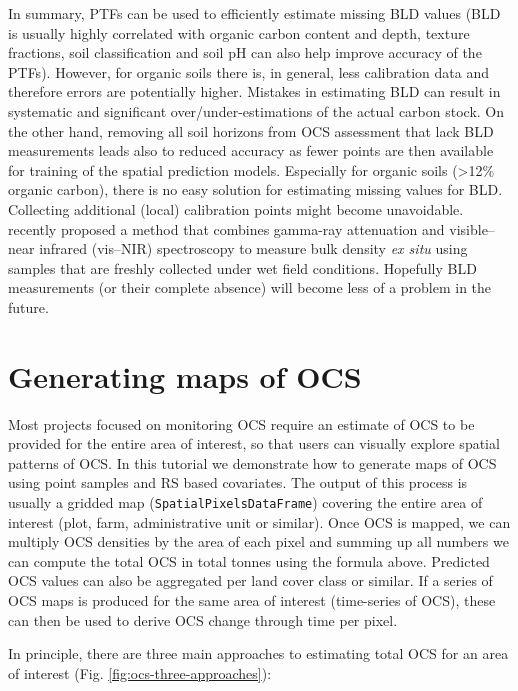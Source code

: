\documentclass[graybox,natbib,nospthms,UStrade]{svmono}
\begin{document}
In summary, PTFs can be used to efficiently estimate missing BLD values (BLD is usually highly correlated with organic carbon content and depth, texture fractions, soil classification and soil pH can also help improve accuracy of the PTFs). However, for organic soils there is, in general, less calibration data and therefore errors are potentially higher. Mistakes in estimating BLD can result in systematic and significant over/under-estimations of the actual carbon stock. On the other hand, removing all soil horizons from OCS assessment that lack BLD measurements leads also to reduced accuracy as fewer points are then available for training of the spatial prediction models. Especially for organic soils (\textgreater{}12\% organic carbon), there is no easy solution for estimating missing values for BLD. Collecting additional (local) calibration points might become unavoidable. \citet{lobsey2016sensing} recently proposed a method that combines gamma-ray attenuation and visible--near infrared (vis--NIR) spectroscopy to measure bulk density \emph{ex situ} using samples that are freshly collected under wet field conditions. Hopefully BLD measurements (or their complete absence) will become less of a problem in the future.

\hypertarget{generating-maps-of-ocs}{%
\section{Generating maps of OCS}\label{generating-maps-of-ocs}}

Most projects focused on monitoring OCS require an estimate of OCS to be provided for the entire area of interest, so that users can visually explore spatial patterns of OCS. In this tutorial we demonstrate how to generate maps of OCS using point samples and RS based covariates. The output of this process is usually a gridded map (\texttt{SpatialPixelsDataFrame}) covering the entire area of interest (plot, farm, administrative unit or similar). Once OCS is mapped, we can multiply OCS densities by the area of each pixel and summing up all numbers we can compute the total OCS in total tonnes using the formula above. Predicted OCS values can also be aggregated per land cover class or similar. If a series of OCS maps is produced for the same area of interest (time-series of OCS), these can then be used to derive OCS change through time per pixel.

In principle, there are three main approaches to estimating total OCS for an area of interest (Fig. \ref{fig:ocs-three-approaches}):
\end{document}
